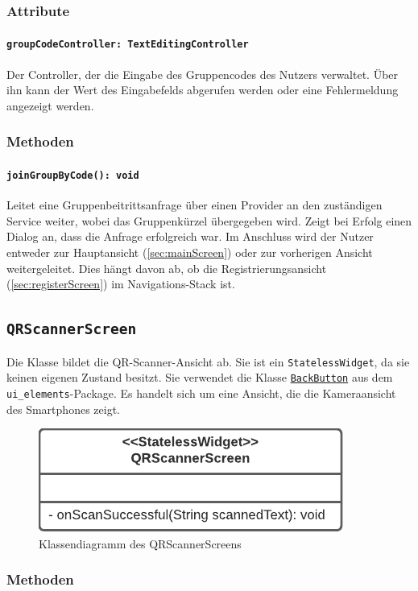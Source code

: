 \documentclass{entwurfsheft}
\begin{document}
\begin{sloppypar}
\subsubsection*{Attribute}
\paragraph{\texttt{groupCodeController: TextEditingController}}
Der Controller, der die Eingabe des Gruppencodes des Nutzers verwaltet. Über ihn kann der Wert des Eingabefelds abgerufen werden oder eine Fehlermeldung angezeigt werden.
\subsubsection*{Methoden}
\paragraph{\texttt{joinGroupByCode(): void}}
Leitet eine Gruppenbeitrittsanfrage über einen Provider an den zuständigen Service weiter, wobei das Gruppenkürzel übergegeben wird. Zeigt bei Erfolg einen \Gls{Dialog} an, dass die Anfrage erfolgreich war. Im Anschluss wird der Nutzer entweder zur Hauptansicht (\ref{sec:mainScreen}) oder zur vorherigen Ansicht weitergeleitet. Dies hängt davon ab, ob die Registrierungsansicht (\ref{sec:registerScreen}) im Navigations-Stack ist.
\newpage

\subsection{\texttt{QRScannerScreen}}
\label{sec:qrScannerScreen}
Die Klasse bildet die QR-Scanner-Ansicht ab. Sie ist ein \texttt{StatelessWidget}, da sie keinen eigenen Zustand besitzt. Sie verwendet die Klasse \hyperref[sec:backButton]{\texttt{BackButton}} aus dem \texttt{ui\_elements}-Package. Es handelt sich um eine Ansicht, die die Kameraansicht des Smartphones zeigt.
\begin{figure}
    [htp]
    \centering
    \includegraphics[width=.49\textwidth]{images/presentationLayer/classDiagrams/qrScannerScreen.pdf}
    \caption{Klassendiagramm des QR\-Scanner\-Screens}
\end{figure}
\subsubsection*{Methoden}

\end{sloppypar}
\end{document}
